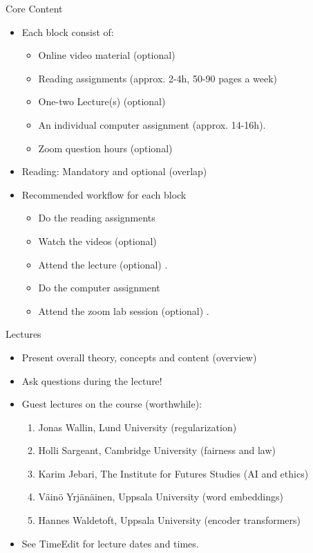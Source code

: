 \documentclass[10pt]{beamer}
\begin{document}
\begin{frame}{Core Content}

\begin{itemize}
\item Each block consist of:
\begin{itemize}
\item Online video material (optional)
\item Reading assignments (approx. 2-4h, 50-90 pages a week)
\item One-two Lecture(s) (optional)
\item An individual computer assignment (approx. 14-16h).
\item Zoom question hours (optional)\pause
\end{itemize}
\item Reading: Mandatory and optional (overlap)\pause
\item Recommended workflow for each block
\begin{itemize}
\item Do the reading assignments
\item Watch the videos (optional)
\item Attend the lecture (optional) .
\item Do the computer assignment
\item Attend the zoom lab session (optional) .
\end{itemize}
\end{itemize}
\end{frame}


\begin{frame}{Lectures}

\begin{itemize}
\item Present overall theory, concepts and content (overview) \pause
\item Ask questions during the lecture!
\item Guest lectures on the course (worthwhile):
\begin{enumerate}
\item Jonas Wallin, Lund University (regularization)\pause
\item Holli Sargeant, Cambridge University (fairness and law)\pause
\item Karim Jebari, The Institute for Futures Studies (AI and ethics)\pause
\item Väinö Yrjänäinen, Uppsala University (word embeddings) \pause
\item Hannes Waldetoft, Uppsala University (encoder transformers) \pause
\end{enumerate}
\item See TimeEdit for lecture dates and times.
\end{itemize}
\end{frame}
\end{document}
